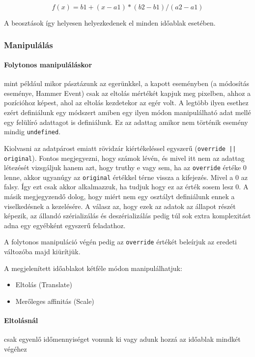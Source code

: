 $$ f(x) = b1 + ( x - a1 ) * ( b2 - b1 ) / ( a2 - a1 )$$

A beosztások így helyesen helyezkedenek el minden időablak esetében.

\subsubsection{Manipulálás}

\paragraph{Folytonos manipuláláskor} mint például mikor pásztázunk az egerünkkel, a kapott eseményben (a módosítás eseménye, Hammer Event) csak az eltolás mértékét kapjuk meg pixelben, ahhoz a pozícióhoz képest, ahol az eltolás kezdetekor az egér volt. A legtöbb ilyen esethez ezért definiálunk egy módszert amiben egy ilyen módon manipulálható adat mellé egy felülíró adattagot is definiálunk. Ez az adattag amikor nem történik esemény mindig \lstinline[columns=fixed]{undefined}.

Kiolvasni az adatpárost emiatt rövidzár kiértékeléssel egyszerű (\lstinline[columns=fixed]{override || original}). Fontos megjegyezni, hogy számok lévén, és mivel itt nem az adattag létezését vizsgáljuk hanem azt, hogy truthy e vagy sem, ha az \lstinline[columns=fixed]{override} értéke $0$ lenne, akkor ugyanúgy az \lstinline[columns=fixed]{original} értékkel térne vissza a kifejezés. Mivel a $0$ az falsy. Így ezt csak akkor alkalmazzuk, ha tudjuk hogy ez az érték sosem lesz $0$. A másik megjegyzendő dolog, hogy miért nem egy osztályt definiálunk ennek a viselkedésnek a kezelésére. A válasz az, hogy ezek az adatok az állapot részét képezik, az állandó szérializálás és deszérializálás pedig túl sok extra komplexitást adna egy egyébként egyszerű feladathoz.

A folytonos manipuláció végén pedig az \lstinline[columns=fixed]{override} értékét beleírjuk az eredeti változóba majd kiürítjük.


A megjelenített időablakot kétféle módon manipulálhatjuk:

\begin{itemize}
	\item Eltolás (Translate)
	\item Merőleges affinitás (Scale)
\end{itemize}

\paragraph{Eltolásnál} csak egyenlő időmennyiséget vonunk ki vagy adunk hozzá az időablak mindkét végéhez

